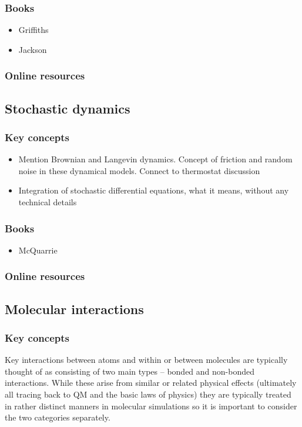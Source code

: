\documentclass[9pt,bestpractices]{livecoms}
\begin{document}
\subsubsection{Books}
\begin{itemize}
\item Griffiths
\item Jackson
\end{itemize}
\subsubsection{Online resources}

\subsection{Stochastic dynamics}
\subsubsection{Key concepts}
\begin{itemize}
\item Mention Brownian and Langevin dynamics. Concept of friction and random
    noise in these dynamical models. Connect to thermostat discussion
\item Integration of stochastic differential equations, what it means, without
    any technical details
\end{itemize}
\subsubsection{Books}
\begin{itemize}
\item McQuarrie
\end{itemize}
\subsubsection{Online resources}

\subsection{Molecular interactions}
\subsubsection{Key concepts}

Key interactions between atoms and within or between molecules are typically
thought of as consisting of two main types -- bonded and non-bonded
interactions.  While these arise from similar or related physical
effects (ultimately all tracing back to QM and the basic laws of
physics) they are typically treated in rather distinct manners in
molecular simulations so it is important to consider the two categories
separately.
\end{document}
